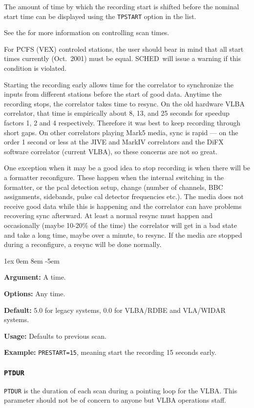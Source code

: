 \documentclass{report}
\newcommand{\schedb}{{\sc SCHED~}}
\newcommand{\rcwbox}[5]{
  \begin{list}{}{\parsep 1ex  \itemsep 0em
                 \leftmargin 8em  \itemindent -5em }
    \item {\bf Argument:} #1
    \item {\bf Options:}  #2
    \item {\bf Default:}  #3
    \item {\bf Usage:}    #4
    \item {\bf Example:}  #5
  \end{list}
}
\begin{document}
The amount of time by which the recording start is shifted before
the nominal start time can be displayed using the {\tt TPSTART} option
in the  list.

See the  for more
information on controlling scan times.

For PCFS (VEX) controled stations, the user should bear in mind that
all start times currently (Oct.\ 2001) must be equal. \schedb will issue
a warning if this condition is violated.

Starting the recording early allows time for the correlator to
synchronize the inputs from different stations before the start of
good data.  Anytime the recording stops, the correlator takes time to
resync.  On the old hardware VLBA correlator, that time is empirically
about 8, 13, and 25 seconds for speedup factors 1, 2 and 4
respectively.  Therefore it was best to keep recording through short
gaps.  On other correlators playing Mark5 media, sync is rapid ---
on the order 1 second or less at the JIVE and MarkIV correlators and the
DiFX software correlator (current VLBA), so these concerns are not so
great.

One exception when it may be a good idea to stop recording is when
there will be a formatter reconfigure.  These happen when the internal
switching in the formatter, or the pcal detection setup, change
(number of channels, BBC assignments, sidebands, pulse cal detector
frequencies etc.).  The media does not receive good data while this is
happening and the correlator can have problems recovering sync afterward.
At least a normal resync must happen and occasionally (maybe 10-20\%
of the time) the correlator will get in a bad state and take a long time,
maybe over a minute, to resync.  If the media are stopped during a
reconfigure, a resync will be done normally.

\rcwbox
{A time.}
{Any time.}
{5.0 for legacy systems, 0.0 for VLBA/RDBE and VLA/WIDAR systems.}
{Defaults to previous scan.}
{{\tt PRESTART=15}, meaning start the recording 15 seconds early.}

\subsubsection{\label{MP:PTDUR}{\tt PTDUR}}

{\tt PTDUR} is the duration of each scan during a pointing loop for
the VLBA. This parameter should not be of concern to anyone but VLBA
operations staff.
\end{document}
